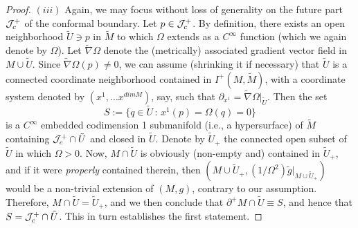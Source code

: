 \begin{proof}
$(iii)$ Again, we may focus without loss of generality on the future part ${\cal J}^+_c$ of the conformal boundary. Let $p \in {\cal J}^+_c$. By definition, there exists an open neighborhood $\tilde{U}\ni p$ in $\tilde{M}$ to which $\Omega$ extends as a $C^{\infty}$ function (which we again denote by $\Omega$). Let $\tilde{\nabla}\Omega$ denote the (metrically) associated gradient vector field in $M\cup \tilde{U}$. Since $\tilde{\nabla}\Omega (p) \neq 0$, we can assume (shrinking it if necessary) that $\tilde{U}$ is a connected coordinate neighborhood contained in $I^+(M, \tilde{M})$, with a coordinate system denoted by $(x^1, \ldots x^{dim M})$, say, such that $\partial _{x^1} = \tilde{\nabla}\Omega|_{\tilde{U}}$. Then the set
\[
S := \{q \in \tilde{U} \, : \, x^1(p) = \Omega(q) =0 \}
\]
is a $C^{\infty}$ embedded codimension 1 submanifold (i.e., a hypersurface) of $\tilde{M}$ containing ${\cal J}^+_c \cap \tilde{U}$ and closed in $\tilde{U}$. Denote by $\tilde{U}_+$ the connected open subset of $\tilde{U}$ in which $\Omega >0$. Now, $M \cap \tilde{U}$ is obviously (non-empty and) contained in $\tilde{U}_+$, and if it were {\em properly} contained therein, then $(M\cup \tilde{U}_{+}, (1/\Omega^2) \tilde{g} |_{M\cup \tilde{U}_{+}})$ would be a non-trivial extension of $(M,g)$, contrary to our assumption. Therefore, $M \cap \tilde{U} = \tilde{U}_+$, and we then conclude that $\partial ^+ M \cap \tilde{U}\equiv S$, and hence that $S = {\cal J}^+_c \cap \tilde{U}$. This in turn establishes the first statement.



\end{proof}
